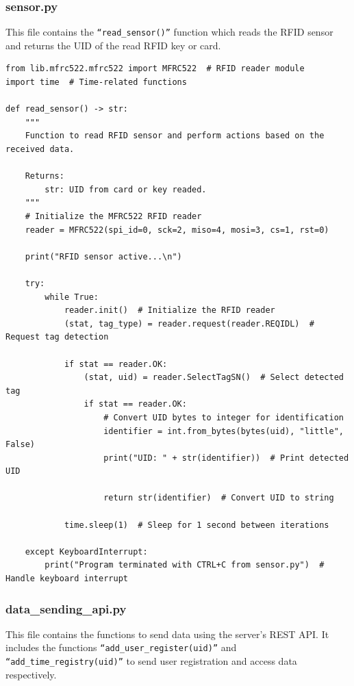 \documentclass{article}
\begin{document}
\subsubsection{sensor.py}
This file contains the \texttt{``read\_sensor()''} function which reads the RFID sensor and returns the UID of the read RFID key or card.
\begin{lstlisting}
from lib.mfrc522.mfrc522 import MFRC522  # RFID reader module
import time  # Time-related functions

def read_sensor() -> str:
    """
    Function to read RFID sensor and perform actions based on the received data.

    Returns:
        str: UID from card or key readed.
    """
    # Initialize the MFRC522 RFID reader
    reader = MFRC522(spi_id=0, sck=2, miso=4, mosi=3, cs=1, rst=0)

    print("RFID sensor active...\n")

    try:
        while True:
            reader.init()  # Initialize the RFID reader
            (stat, tag_type) = reader.request(reader.REQIDL)  # Request tag detection

            if stat == reader.OK:
                (stat, uid) = reader.SelectTagSN()  # Select detected tag
                if stat == reader.OK:
                    # Convert UID bytes to integer for identification
                    identifier = int.from_bytes(bytes(uid), "little", False)
                    print("UID: " + str(identifier))  # Print detected UID

                    return str(identifier)  # Convert UID to string
                
            time.sleep(1)  # Sleep for 1 second between iterations

    except KeyboardInterrupt:
        print("Program terminated with CTRL+C from sensor.py")  # Handle keyboard interrupt
\end{lstlisting}

\subsubsection{data\_sending\_api.py}
This file contains the functions to send data using the server's REST API.
It includes the functions \texttt{``add\_user\_register(uid)''} and \texttt{``add\_time\_registry(uid)''} to send user registration and access data respectively.
\end{document}
